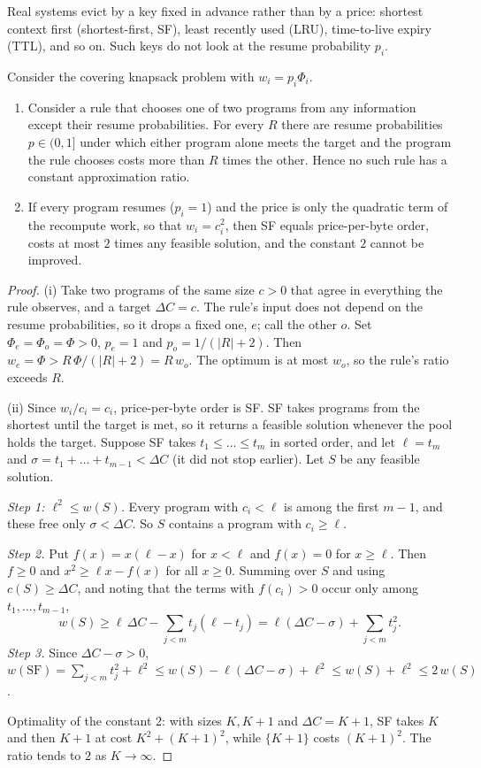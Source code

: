 Real systems evict by a key fixed in advance rather than by a price: shortest
context first (shortest-first, SF), least recently used (LRU), time-to-live
expiry (TTL), and so on. Such keys do not look at the resume probability $p_i$.

\begin{proposition}\label{prop:blind}
Consider the covering knapsack problem with $w_i=p_i\Phi_i$.
\begin{enumerate}[label=(\roman*)]
\item Consider a rule that chooses one of two programs from any information except
  their resume probabilities. For every $R$ there are resume probabilities
  $p\in(0,1]$ under which either program alone meets the target and the program
  the rule chooses costs more than $R$ times the other. Hence no such rule has a
  constant approximation ratio.
\item If every program resumes ($p_i=1$) and the price is only the quadratic term
  of the recompute work, so that $w_i=c_i^2$, then SF equals price-per-byte order,
  costs at most $2$ times any feasible solution, and the constant $2$ cannot be
  improved.
\end{enumerate}
\end{proposition}

\begin{proof}
(i) Take two programs of the same size $c>0$ that agree in everything the rule
observes, and a target $\Delta C=c$. The rule's input does not depend on the
resume probabilities, so it drops a fixed one, $e$; call the other $o$. Set
$\Phi_e=\Phi_o=\Phi>0$, $p_e=1$ and $p_o=1/(|R|+2)$. Then
$w_e=\Phi>R\,\Phi/(|R|+2)=R\,w_o$. The optimum is at most $w_o$, so the rule's
ratio exceeds $R$.

(ii) Since $w_i/c_i=c_i$, price-per-byte order is SF. SF takes programs from the
shortest until the target is met, so it returns a feasible solution whenever the
pool holds the target. Suppose SF takes $t_1\le\dots\le t_m$ in sorted order, and
let $\ell=t_m$ and $\sigma=t_1+\dots+t_{m-1}<\Delta C$ (it did not stop earlier).
Let $S$ be any feasible solution.

\emph{Step 1: $\ell^2\le w(S)$.} Every program with $c_i<\ell$ is among the first
$m-1$, and these free only $\sigma<\Delta C$. So $S$ contains a program with
$c_i\ge\ell$.

\emph{Step 2.} Put $f(x)=x(\ell-x)$ for $x<\ell$ and $f(x)=0$ for $x\ge\ell$. Then
$f\ge0$ and $x^2\ge\ell x-f(x)$ for all $x\ge0$. Summing over $S$ and using
$c(S)\ge\Delta C$, and noting that the terms with $f(c_i)>0$ occur only among
$t_1,\dots,t_{m-1}$,
\[
  w(S)\ge\ell\,\Delta C-\sum_{j<m}t_j(\ell-t_j)=\ell(\Delta C-\sigma)+\sum_{j<m}t_j^2 .
\]
\emph{Step 3.} Since $\Delta C-\sigma>0$,
$w(\mathrm{SF})=\sum_{j<m}t_j^2+\ell^2\le w(S)-\ell(\Delta C-\sigma)+\ell^2\le w(S)+\ell^2\le2\,w(S)$.

Optimality of the constant 2: with sizes $K,K+1$ and $\Delta C=K+1$, SF takes $K$
and then $K+1$ at cost $K^2+(K+1)^2$, while $\{K+1\}$ costs $(K+1)^2$. The ratio
tends to $2$ as $K\to\infty$.
\end{proof}

